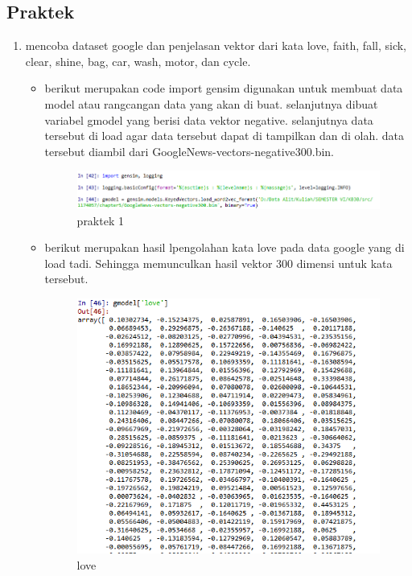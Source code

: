    	\subsection{Praktek}
   		\begin{enumerate}
   			\item mencoba dataset google dan penjelasan vektor dari kata love, faith, fall, sick, clear, shine, bag, car, wash, motor, dan cycle.
   			\begin{itemize}
   				\item berikut merupakan code import gensim digunakan untuk membuat data model atau rangcangan data yang akan di buat. selanjutnya dibuat variabel gmodel yang berisi data vektor negative. selanjutnya data tersebut di load agar data tersebut dapat di tampilkan dan di olah. data tersebut diambil dari GoogleNews-vectors-negative300.bin.
	  			\begin{figure}[H]
					\centering
					\includegraphics[scale=0.4]{figures/1174057/chapter5/7.PNG}
					\caption{praktek 1}
					\label{praktek 1}
				\end{figure}

				\item berikut merupakan hasil lpengolahan kata love pada data google yang di load tadi. Sehingga memunculkan hasil vektor 300 dimensi untuk kata tersebut.
	  			\begin{figure}[H]
					\centering
					\includegraphics[scale=0.4]{figures/1174057/chapter5/love.PNG}
					\caption{love}
					\label{love}
				\end{figure}


\end{itemize}
\end{enumerate}
